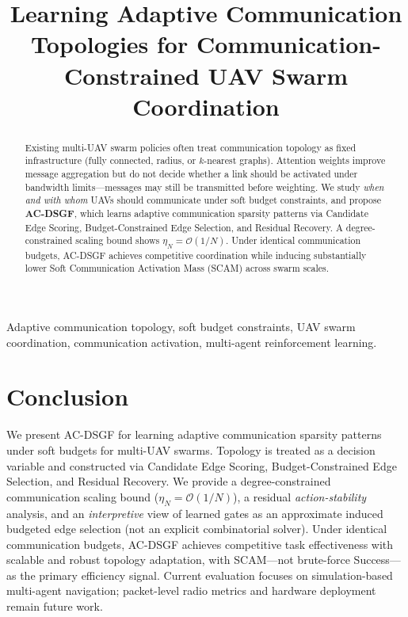 \documentclass[letterpaper,10pt,journal]{IEEEtran}
\title{Learning Adaptive Communication Topologies for Communication-Constrained UAV Swarm Coordination}
\author{%
}
\begin{document}
\maketitle

\begin{abstract}
Existing multi-UAV swarm policies often treat communication topology as fixed
infrastructure (fully connected, radius, or $k$-nearest graphs).
Attention weights improve message aggregation but do not decide whether a link
should be activated under bandwidth limits---messages may still be transmitted
before weighting.
We study \emph{when and with whom} UAVs should communicate under soft budget
constraints, and propose \textbf{AC-DSGF}, which learns adaptive communication
sparsity patterns via Candidate Edge Scoring, Budget-Constrained Edge Selection,
and Residual Recovery.
A degree-constrained scaling bound shows $\eta_N=\mathcal{O}(1/N)$.
Under identical communication budgets, AC-DSGF achieves competitive coordination
while inducing substantially lower Soft Communication Activation Mass (SCAM)
across swarm scales.
\end{abstract}

\begin{IEEEkeywords}
Adaptive communication topology, soft budget constraints, UAV swarm
coordination, communication activation, multi-agent reinforcement learning.
\end{IEEEkeywords}








\section{Conclusion}
\label{sec:conclusion}
We present AC-DSGF for learning adaptive communication sparsity patterns under
soft budgets for multi-UAV swarms.
Topology is treated as a decision variable and constructed via Candidate Edge
Scoring, Budget-Constrained Edge Selection, and Residual Recovery.
We provide a degree-constrained communication scaling bound
($\eta_N=\mathcal{O}(1/N)$), a residual \emph{action-stability} analysis, and an
\emph{interpretive} view of learned gates as an approximate induced budgeted
edge selection (not an explicit combinatorial solver).
Under identical communication budgets, AC-DSGF achieves competitive task
effectiveness with scalable and robust topology adaptation, with SCAM---not
brute-force Success---as the primary efficiency signal.
Current evaluation focuses on simulation-based multi-agent navigation;
packet-level radio metrics and hardware deployment remain future work.



\end{document}

